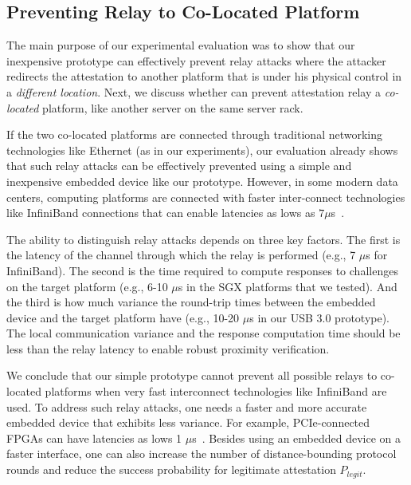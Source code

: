 \subsection{Preventing Relay to Co-Located Platform}
\label{sec:co-located}

The main purpose of our experimental evaluation was to show that our inexpensive \name prototype can effectively prevent relay attacks where the attacker redirects the attestation to another platform that is under his physical control in a \emph{different location}. Next, we discuss whether \name can prevent attestation relay a \emph{co-located} platform, like another server on the same server rack.

If the two co-located platforms are connected through traditional networking technologies like Ethernet (as in our experiments), our evaluation already shows that such relay attacks can be effectively prevented using a simple and inexpensive embedded device like our prototype. However, in some modern data centers, computing platforms are connected with faster inter-connect technologies like InfiniBand connections that can enable latencies as lows as $7 \mu$s~\cite{liu2003performance}. 

The ability to distinguish relay attacks depends on three key factors. The first is the latency of the channel through which the relay is performed (e.g., 7 $\mu$s for InfiniBand). The second is the time required to compute responses to challenges on the target platform (e.g., 6-10 $\mu$s in the SGX platforms that we tested). And the third is how much variance the round-trip times between the embedded device and the target platform have (e.g., 10-20 $\mu$s in our USB 3.0 prototype). The local communication variance and the response computation time should be less than the relay latency to enable robust proximity verification. 

We conclude that our simple prototype cannot prevent all possible relays to co-located platforms when very fast interconnect technologies like InfiniBand are used. To address such relay attacks, one needs a faster and more accurate embedded device that exhibits less variance. For example, PCIe-connected FPGAs can have latencies as lows 1 $\mu$s~\cite{algoLogic}. Besides using an embedded device on a faster interface, one can also increase the number of distance-bounding protocol rounds and reduce the success probability for legitimate attestation $P_{legit}$.


